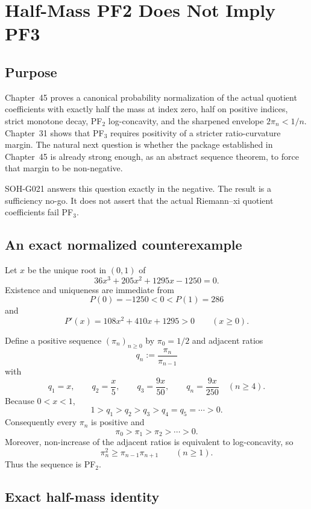 \chapter{Half-Mass PF2 Does Not Imply PF3}
\label{chap:half-mass-pf2-not-pf3}


\section{Purpose}

Chapter~45 proves a canonical probability normalization of the actual quotient coefficients with exactly half the mass at index zero, half on positive indices, strict monotone decay, PF$_2$ log-concavity, and the sharpened envelope $2\pi_n<1/n$. Chapter~31 shows that PF$_3$ requires positivity of a stricter ratio-curvature margin. The natural next question is whether the package established in Chapter~45 is already strong enough, as an abstract sequence theorem, to force that margin to be non-negative.

SOH-G021 answers this question exactly in the negative. The result is a sufficiency no-go. It does not assert that the actual Riemann--xi quotient coefficients fail PF$_3$.

\section{An exact normalized counterexample}

Let $x$ be the unique root in $(0,1)$ of
\[
 \boxed{36x^3+205x^2+1295x-1250=0.}
\]
Existence and uniqueness are immediate from
\[
 P(0)=-1250<0<P(1)=286
\]
and
\[
 P'(x)=108x^2+410x+1295>0
 \qquad(x\ge0).
\]

Define a positive sequence $(\pi_n)_{n\ge0}$ by $\pi_0=1/2$ and adjacent ratios
\[
 q_n:=\frac{\pi_n}{\pi_{n-1}}
\]
with
\[
 q_1=x,
 \qquad
 q_2=\frac{x}{5},
 \qquad
 q_3=\frac{9x}{50},
 \qquad
 q_n=\frac{9x}{250}\quad(n\ge4).
\]
Because $0<x<1$,
\[
 1>q_1>q_2>q_3>q_4=q_5=\cdots>0.
\]
Consequently every $\pi_n$ is positive and
\[
 \pi_0>\pi_1>\pi_2>\cdots>0.
\]
Moreover, non-increase of the adjacent ratios is equivalent to log-concavity, so
\[
 \boxed{\pi_n^2\ge\pi_{n-1}\pi_{n+1}}
 \qquad(n\ge1).
\]
Thus the sequence is PF$_2$.

\section{Exact half-mass identity}

